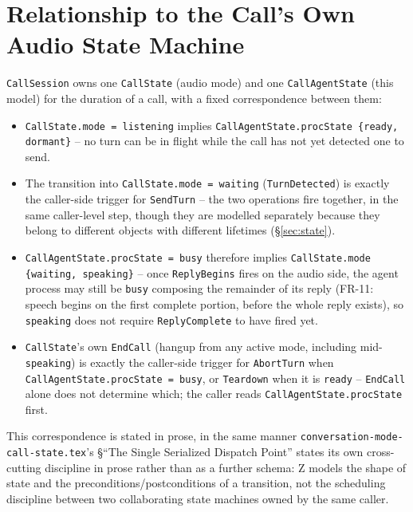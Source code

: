 \documentclass[a4paper,10pt,fleqn]{article}
\begin{document}
\section{Relationship to the Call's Own Audio State Machine}
\label{sec:relation}

\texttt{CallSession} owns one \texttt{CallState} (audio mode) and one
\texttt{CallAgentState} (this model) for the duration of a call, with a fixed
correspondence between them:

\begin{itemize}
  \item \texttt{CallState.mode = listening} implies
    \texttt{CallAgentState.procState \in \{ready, dormant\}} -- no turn can be
    in flight while the call has not yet detected one to send.
  \item The transition into \texttt{CallState.mode = waiting}
    (\texttt{TurnDetected}) is exactly the caller-side trigger for
    \texttt{SendTurn} -- the two operations fire together, in the same
    caller-level step, though they are modelled separately because they
    belong to different objects with different lifetimes (\S\ref{sec:state}).
  \item \texttt{CallAgentState.procState = busy} therefore implies
    \texttt{CallState.mode \in \{waiting, speaking\}} -- once
    \texttt{ReplyBegins} fires on the audio side, the agent process may still
    be \texttt{busy} composing the remainder of its reply (FR-11: speech
    begins on the first complete portion, before the whole reply exists),
    so \texttt{speaking} does not require \texttt{ReplyComplete} to have
    fired yet.
  \item \texttt{CallState}'s own \texttt{EndCall} (hangup from any active
    mode, including mid-\texttt{speaking}) is exactly the caller-side trigger
    for \texttt{AbortTurn} when \texttt{CallAgentState.procState = busy}, or
    \texttt{Teardown} when it is \texttt{ready} -- \texttt{EndCall} alone
    does not determine which; the caller reads
    \texttt{CallAgentState.procState} first.
\end{itemize}

This correspondence is stated in prose, in the same manner
\texttt{conversation-mode-call-state.tex}'s \S``The Single Serialized
Dispatch Point'' states its own cross-cutting discipline in prose rather than
as a further schema: Z models the shape of state and the
preconditions/postconditions of a transition, not the scheduling discipline
between two collaborating state machines owned by the same caller.
\end{document}
